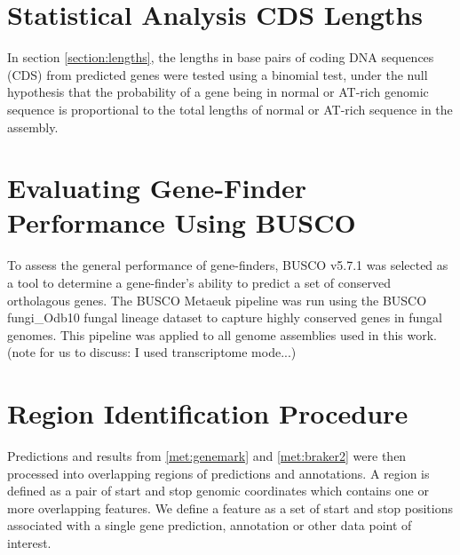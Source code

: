 
\section{Statistical Analysis CDS Lengths}

In section \ref{section:lengths}, the lengths in base pairs of coding
DNA sequences (CDS) from predicted genes were tested using a binomial
test, under the null hypothesis that the probability of a gene being
in normal or AT-rich genomic sequence is proportional to the total
lengths of normal or AT-rich sequence in the assembly.

\section{Evaluating Gene-Finder Performance Using BUSCO}

To assess the general performance of gene-finders, BUSCO
v5.7.1\cite{10.1093/bioinformatics/btv351} was selected as a tool to
determine a gene-finder's ability to predict a set of conserved
ortholagous genes. The BUSCO Metaeuk pipeline was run using the BUSCO
fungi\_Odb10 fungal lineage dataset to capture highly conserved genes
in fungal genomes. This pipeline was applied to all genome assemblies
used in this work. (note for us to discuss: I used transcriptome
mode...)

\section{Region Identification Procedure}
\label{section:region-met}

Predictions and results from \ref{met:genemark} and \ref{met:braker2}
were then processed into overlapping regions of predictions and
annotations. A region is defined as a pair of start and stop genomic
coordinates which contains one or more overlapping features. We define
a feature as a set of start and stop positions associated with a
single gene prediction, annotation or other data point of interest.

